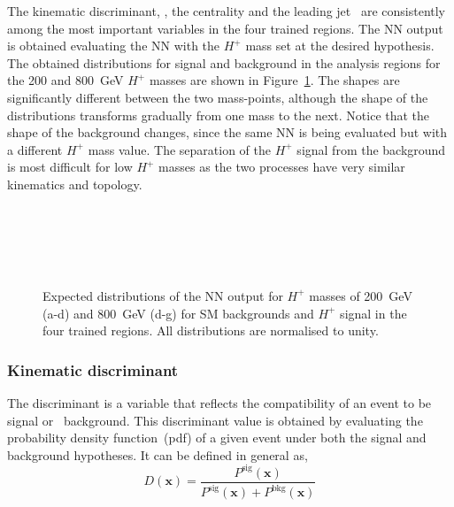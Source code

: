 The kinematic discriminant, \HTjets, the centrality and the leading jet \pT\ are consistently among the most important variables in the four trained regions. The NN output is obtained evaluating the NN with the $H^+$ mass set at the desired hypothesis. The obtained distributions for signal and background in the analysis regions for the 200 and 800~GeV $H^+$ masses are shown in Figure~\ref{Hplustb:NNshapes}. The shapes are significantly different between the two mass-points, although the shape of the distributions transforms gradually from one mass to the next. Notice that the shape of the background changes, since the same NN is being evaluated but with a different $H^+$ mass value. The separation of the $H^+$ signal from the background is most difficult for low $H^+$ masses as the two processes have very similar kinematics and topology.

\begin{figure}[htb]
    \RawFloats
    \centering
     \\
     \\
     \\
     \\
    \caption{Expected distributions of the NN output for $H^+$ masses of 200~GeV (a-d)
    and 800~GeV (d-g) for SM backgrounds and $H^+$ signal in the four trained regions.
    All distributions are normalised to unity.
    }
    \label{Hplustb:NNshapes}
\end{figure}
\clearpage
\subsubsection{Kinematic discriminant}
\label{Hplustb:SectionHplusDiscriminant}

The discriminant is a variable that reflects the compatibility of an event to be signal or \ttbar\ background. This discriminant value is obtained by evaluating the probability density function~(pdf) of a given event under both the signal and background hypotheses. It can be defined in general as,
\begin{equation}
    D(\textbf{x})=\frac{P^{\text{sig}}(\textbf{x})}{P^{\text{sig}}(\textbf{x})+P^{\text{bkg}}(\textbf{x})}
    \label{eq3:discriminant}
\end{equation}

